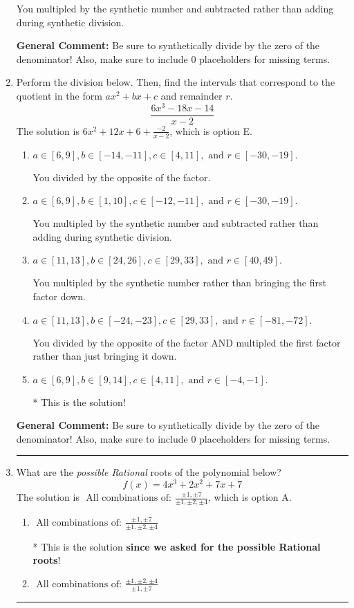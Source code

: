 \documentclass{extbook}[14pt]
\newcommand{\litem}[1]{\item #1

\rule{\textwidth}{0.4pt}}
\begin{document}
\begin{enumerate}
{\begin{enumerate}[label=\Alph*.]
 You multipled by the synthetic number and subtracted rather than adding during synthetic division.
\end{enumerate}

\textbf{General Comment:} Be sure to synthetically divide by the zero of the denominator! Also, make sure to include 0 placeholders for missing terms.
}
\litem{
Perform the division below. Then, find the intervals that correspond to the quotient in the form $ax^2+bx+c$ and remainder $r$.
\[ \frac{6x^{3} -18 x -14}{x -2} \]The solution is \( 6x^{2} +12 x + 6 + \frac{-2}{x -2} \), which is option E.\begin{enumerate}[label=\Alph*.]
\item \( a \in [6, 9], b \in [-14, -11], c \in [4, 11], \text{ and } r \in [-30, -19]. \)

 You divided by the opposite of the factor.
\item \( a \in [6, 9], b \in [1, 10], c \in [-12, -11], \text{ and } r \in [-30, -19]. \)

 You multipled by the synthetic number and subtracted rather than adding during synthetic division.
\item \( a \in [11, 13], b \in [24, 26], c \in [29, 33], \text{ and } r \in [40, 49]. \)

 You multipled by the synthetic number rather than bringing the first factor down.
\item \( a \in [11, 13], b \in [-24, -23], c \in [29, 33], \text{ and } r \in [-81, -72]. \)

 You divided by the opposite of the factor AND multipled the first factor rather than just bringing it down.
\item \( a \in [6, 9], b \in [9, 14], c \in [4, 11], \text{ and } r \in [-4, -1]. \)

* This is the solution!
\end{enumerate}

\textbf{General Comment:} Be sure to synthetically divide by the zero of the denominator! Also, make sure to include 0 placeholders for missing terms.
}
\litem{
What are the \textit{possible Rational} roots of the polynomial below?
\[ f(x) = 4x^{3} +2 x^{2} +7 x + 7 \]The solution is \( \text{ All combinations of: }\frac{\pm 1,\pm 7}{\pm 1,\pm 2,\pm 4} \), which is option A.\begin{enumerate}[label=\Alph*.]
\item \( \text{ All combinations of: }\frac{\pm 1,\pm 7}{\pm 1,\pm 2,\pm 4} \)

* This is the solution \textbf{since we asked for the possible Rational roots}!
\item \( \text{ All combinations of: }\frac{\pm 1,\pm 2,\pm 4}{\pm 1,\pm 7} \)


\end{enumerate}}
\end{enumerate}
\end{document}
